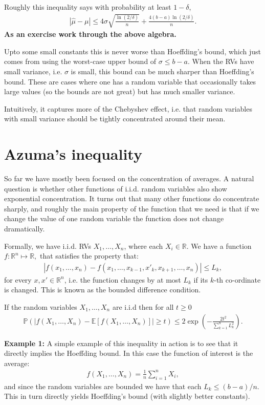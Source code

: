 \documentclass[twoside,12pt]{article}
\begin{document}
Roughly this inequality says with probability at least $1 - \delta$,
\begin{align*}
|\widehat{\mu} - \mu| \leq 4 \sigma \sqrt{ \frac{\ln (2/\delta)}{n}} +  \frac{ 4(b-a) \ln(2/\delta)}{n}.
\end{align*}
{\bf As an exercise work through the above algebra.}

Upto some small constants this is never worse than Hoeffding's bound, which just comes from using the worst-case upper bound of $\sigma \leq b - a.$ When the RVs have small variance, i.e. $\sigma$ is small, this bound can be much sharper than Hoeffding's bound. These are cases where one has a random variable that occasionally takes large values (so the bounds are not great) but has much smaller variance. 

Intuitively, it captures more of the Chebyshev effect, i.e. that random variables with small variance should be tightly concentrated around their mean. 

\section{Azuma's inequality}
So far we have mostly been focused on the concentration of averages. A natural question is whether other functions of i.i.d. random variables also show exponential concentration. It turns out that many other functions do concentrate sharply, and roughly the main property of the function that we need is that if we change the value of one random variable the function does not change dramatically.

Formally, we have i.i.d. RVs $X_1,\ldots,X_n$, where each $X_i \in \mathbb{R}$. We have a function $f: \mathbb{R}^n \mapsto \mathbb{R},$ that satisfies the property that:
\begin{align*}
|f(x_1,\ldots,x_n) - f(x_1,\ldots,x_{k-1}, x'_k, x_{k+1},\ldots,x_n)| \leq L_k,
\end{align*}
for every $x,x' \in \mathbb{R}^n$, i.e. the function changes by at most $L_k$ if its $k$-th co-ordinate is changed. This is known as the bounded difference condition.

If the random variables $X_1,\ldots, X_n$ are i.i.d then for all $t \geq 0$
\begin{align*}
\mathbb{P}(|f(X_1,\ldots,X_n) - \mathbb{E}[f(X_1,\ldots,X_n)] | \geq t) \leq 2 \exp \left( - \frac{2t^2}{\sum_{k=1}^n L_k^2} \right).
\end{align*}

{\bf Example 1: } A simple example of this inequality in action is to see that it directly implies the Hoeffding bound. In this case the function of interest is the average:
\begin{align*}
f(X_1,\ldots,X_n) = \frac{1}{n} \sum_{i=1}^n X_i,
\end{align*}
and since the random variables are bounded we have that each $L_k \leq (b - a)/n$. This in turn directly yields Hoeffding's bound (with slightly better constants).
\end{document}
